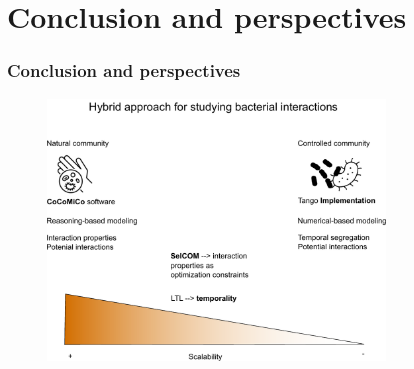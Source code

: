 \documentclass[8pt,usenames,dvipsnames]{beamer}
\begin{document}
\section{Conclusion and perspectives}

\begin{frame}
\frametitle{Conclusion and perspectives}
\begin{figure}[H]
    \begin{center}
        \includegraphics[width=0.8\textwidth]{figures/conclusion.pdf}
        \label{fig:explication}
    \end{center}
\end{figure}


\end{frame}
\end{document}
